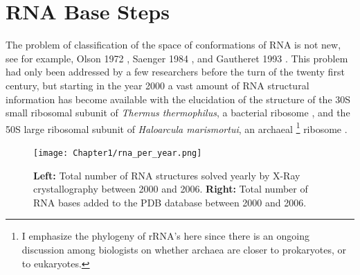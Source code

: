 \chapter{RNA Base Steps}
\label{basesteps} 


The problem of classification of the space of conformations
of  RNA is  not new,  see  for example,  Olson 1972  \cite{olson1972},
Saenger     1984     \cite{saenger1984},     and    Gautheret     1993
\cite{gautheret1993}.  This problem  had  only been  addressed by  a few
researchers before the  turn of the twenty first century,  but starting in
the year 2000  a vast amount of RNA  structural information has become
available  with the  elucidation of  the  structure of  the 30S  small
ribosomal  subunit  of   \textit{Thermus  thermophilus},  a  bacterial
ribosome   \cite{wimberly2000,schluenzen2000},  and   the   50S  large
ribosomal subunit of \textit{Haloarcula marismortui}, an archaeal
\footnote{I emphasize the  phylogeny of rRNA's here since  there is an
  ongoing discussion among biologists on whether archaea are  closer
  to prokaryotes, or to eukaryotes.}  ribosome \cite{ban2000}.

\begin{figure}[H]
\centering
\texttt{[image: Chapter1/rna\_per\_year.png]}
\caption{\textbf{Left:} Total number of RNA structures solved yearly by X-Ray 
crystallography between 2000 and 2006. \textbf{Right:} Total number of 
RNA bases added to the PDB database between 2000 and 2006.}
\label{fig:rnainpdb}
\end{figure}

